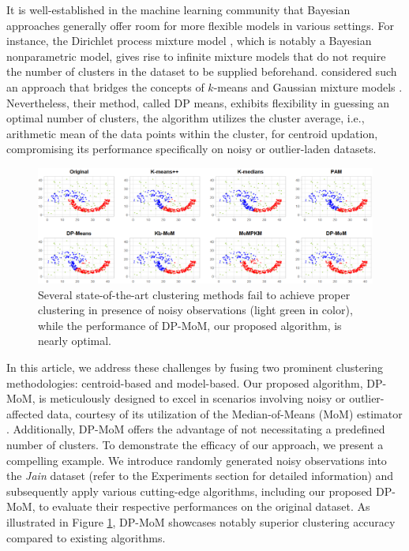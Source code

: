 \documentclass[11pt]{article}
\begin{document}
It is well-established in the machine learning community that Bayesian approaches generally offer room for more flexible models in various settings. For instance, the Dirichlet process mixture model \citep{hjort_holmes_müller_walker_2010}, which is notably a Bayesian nonparametric model, gives rise to infinite mixture models that do not require the number of clusters in the dataset to be supplied beforehand. \citep{DP-Means} considered such an approach that bridges the concepts of $k$-means and Gaussian mixture models \citep{bishop2006pattern,murphy2018machine}. Nevertheless, their method, called DP means, exhibits flexibility in guessing an optimal number of clusters, the algorithm utilizes the cluster average, i.e., arithmetic mean of the data points within the cluster, for centroid updation, compromising its performance specifically on noisy or outlier-laden datasets.

\begin{figure}[t]
    \centering
    \includegraphics[width = \textwidth]{Diagrams/plot-jain-sim-comparison-0.7.png}
    \caption{Several state-of-the-art clustering methods fail to achieve proper clustering in presence of noisy observations (light green in color), while the performance of DP-MoM, our proposed algorithm, is nearly optimal.}
    \label{fig:jain-out}
\end{figure}

In this article, we address these challenges by fusing two prominent clustering methodologies: centroid-based and model-based. Our proposed algorithm, DP-MoM, is meticulously designed to excel in scenarios involving noisy or outlier-affected data, courtesy of its utilization of the Median-of-Means (MoM) estimator \citep{nemirovsky1983wiley,devroye-MoM}. Additionally, DP-MoM offers the advantage of not necessitating a predefined number of clusters. To demonstrate the efficacy of our approach, we present a compelling example. We introduce randomly generated noisy observations into the \textit{Jain} dataset \citep{jain-dataset} (refer to the Experiments section for detailed information) and subsequently apply various cutting-edge algorithms, including our proposed DP-MoM, to evaluate their respective performances on the original dataset. As illustrated in Figure \ref{fig:jain-out}, DP-MoM showcases notably superior clustering accuracy compared to existing algorithms.
\end{document}
